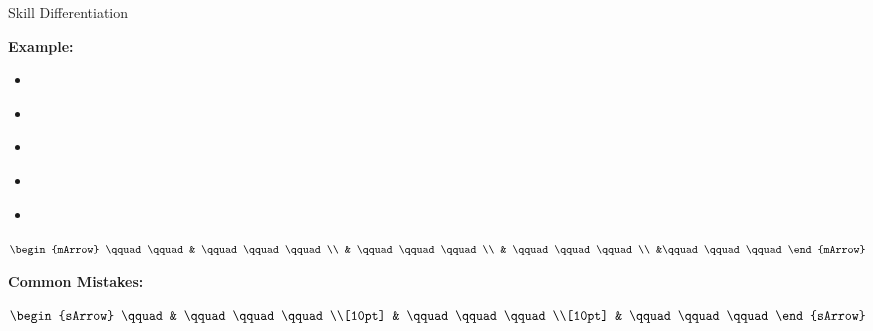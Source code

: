 \clearpage
{}
\begin{boxSkill}{Skill \thenskill \quad Differentiation}
    \noindent%

	\textbf{Example:}
	\begin{itemize}[leftmargin=0.8cm]
	     \item[] $\qquad\qquad\qquad    $
	     \item[] $\qquad\qquad\qquad     $
	     \item[] $\qquad\qquad\qquad      $ 
	     \item[] $\qquad\qquad\qquad    $
	     \item[] $\qquad\qquad\qquad  $	 
	\end{itemize}
	
	 $\begin{mArrow}
        \qquad \qquad &    \qquad\qquad\qquad          \\
                      & \qquad\qquad\qquad \\
			          & \qquad\qquad\qquad  \\
			          &\qquad\qquad\qquad
 	 \end{mArrow}$\\[0.5cm]
	 
	
	\tcbline
	
    \textbf{Common Mistakes:}\\[0.6cm]
	\begin{warningEnv}
	    $\begin{sArrow}
	        \qquad   & \qquad\qquad\qquad \\[10pt]
	  	             & \qquad\qquad\qquad                                                                        \\[10pt] 
                     & \qquad\qquad\qquad 				   
		 \end{sArrow}$		   
    \end{warningEnv}
\end{boxSkill}

